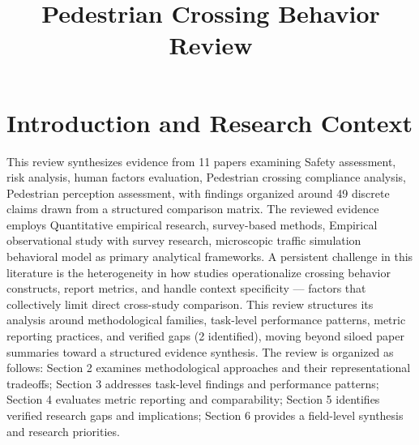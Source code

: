 \documentclass{article}
\title{Pedestrian Crossing Behavior Review}
\begin{document}
\maketitle
\section{Introduction and Research Context}
This review synthesizes evidence from 11 papers examining Safety assessment, risk analysis, human factors evaluation, Pedestrian crossing compliance analysis, Pedestrian perception assessment, with findings organized around 49 discrete claims drawn from a structured comparison matrix. The reviewed evidence employs Quantitative empirical research, survey-based methods, Empirical observational study with survey research, microscopic traffic simulation behavioral model as primary analytical frameworks. A persistent challenge in this literature is the heterogeneity in how studies operationalize crossing behavior constructs, report metrics, and handle context specificity — factors that collectively limit direct cross-study comparison. This review structures its analysis around methodological families, task-level performance patterns, metric reporting practices, and verified gaps (2 identified), moving beyond siloed paper summaries toward a structured evidence synthesis. The review is organized as follows: Section 2 examines methodological approaches and their representational tradeoffs; Section 3 addresses task-level findings and performance patterns; Section 4 evaluates metric reporting and comparability; Section 5 identifies verified research gaps and implications; Section 6 provides a field-level synthesis and research priorities.
\end{document}

